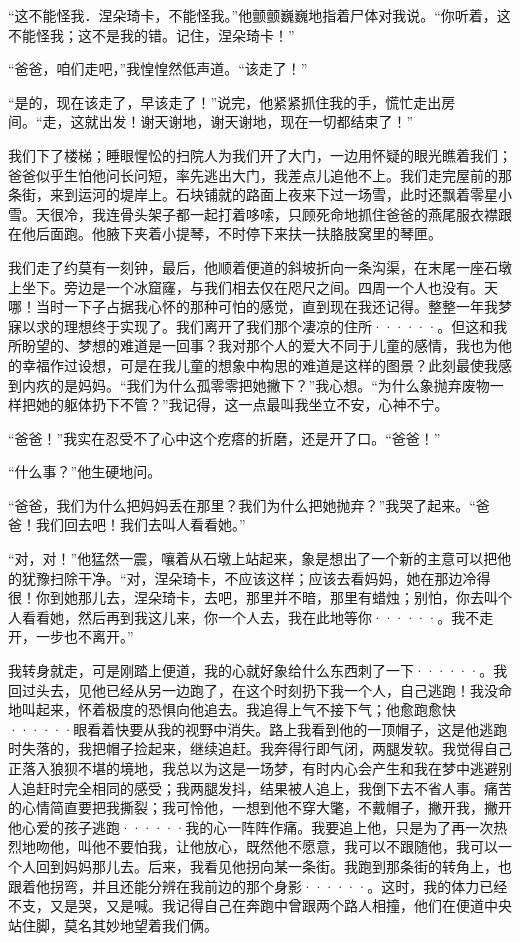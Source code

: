 \documentclass[12pt, UTF8]{ctexbook}
\begin{document}
\par “这不能怪我．涅朵琦卡，不能怪我。”他颤颤巍巍地指着尸体对我说。“你听着，这不能怪我；这不是我的错。记住，涅朵琦卡！”
\par “爸爸，咱们走吧，”我惶惶然低声道。“该走了！”
\par “是的，现在该走了，早该走了！”说完，他紧紧抓住我的手，慌忙走出房间。“走，这就出发！谢天谢地，谢天谢地，现在一切都结束了！”
\par 我们下了楼梯；睡眼惺忪的扫院人为我们开了大门，一边用怀疑的眼光瞧着我们；爸爸似乎生怕他问长问短，率先逃出大门，我差点儿追他不上。我们走完屋前的那条街，来到运河的堤岸上。石块铺就的路面上夜来下过一场雪，此时还飘着零星小雪。天很冷，我连骨头架子都一起打着哆嗦，只顾死命地抓住爸爸的燕尾服衣襟跟在他后面跑。他腋下夹着小提琴，不时停下来扶一扶胳肢窝里的琴匣。
\par 我们走了约莫有一刻钟，最后，他顺着便道的斜坡折向一条沟渠，在末尾一座石墩上坐下。旁边是一个冰窟窿，与我们相去仅在咫尺之间。四周一个人也没有。天哪！当时一下子占据我心怀的那种可怕的感觉，直到现在我还记得。整整一年我梦寐以求的理想终于实现了。我们离开了我们那个凄凉的住所······。但这和我所盼望的、梦想的难道是一回事？我对那个人的爱大不同于儿童的感情，我也为他的幸福作过设想，可是在我儿童的想象中构思的难道是这样的图景？此刻最使我感到内疚的是妈妈。“我们为什么孤零零把她撇下？”我心想。“为什么象抛弃废物一样把她的躯体扔下不管？”我记得，这一点最叫我坐立不安，心神不宁。
\par “爸爸！”我实在忍受不了心中这个疙瘩的折磨，还是开了口。“爸爸！”
\par “什么事？”他生硬地问。
\par “爸爸，我们为什么把妈妈丢在那里？我们为什么把她抛弃？”我哭了起来。“爸爸！我们回去吧！我们去叫人看看她。”
\par “对，对！”他猛然一震，嚷着从石墩上站起来，象是想出了一个新的主意可以把他的犹豫扫除干净。“对，涅朵琦卡，不应该这样；应该去看妈妈，她在那边冷得很！你到她那儿去，涅朵琦卡，去吧，那里并不暗，那里有蜡烛；别怕，你去叫个人看看她，然后再到我这儿来，你一个人去，我在此地等你······。我不走开，一步也不离开。”
\par 我转身就走，可是刚踏上便道，我的心就好象给什么东西刺了一下······。我回过头去，见他已经从另一边跑了，在这个时刻扔下我一个人，自己逃跑！我没命地叫起来，怀着极度的恐惧向他追去。我追得上气不接下气；他愈跑愈快······眼看着快要从我的视野中消失。路上我看到他的一顶帽子，这是他逃跑时失落的，我把帽子捡起来，继续追赶。我奔得行即气闭，两腿发软。我觉得自己正落入狼狈不堪的境地，我总以为这是一场梦，有时内心会产生和我在梦中逃避别人追赶时完全相同的感受；我两腿发抖，结果被人追上，我倒下去不省人事。痛苦的心情简直要把我撕裂；我可怜他，一想到他不穿大氅，不戴帽子，撇开我，撇开他心爱的孩子逃跑······我的心一阵阵作痛。我要追上他，只是为了再一次热烈地吻他，叫他不要怕我，让他放心，既然他不愿意，我可以不跟随他，我可以一个人回到妈妈那儿去。后来，我看见他拐向某一条街。我跑到那条街的转角上，也跟着他拐弯，并且还能分辨在我前边的那个身影······。这时，我的体力已经不支，又是哭，又是喊。我记得自己在奔跑中曾跟两个路人相撞，他们在便道中央站住脚，莫名其妙地望着我们俩。
\end{document}
